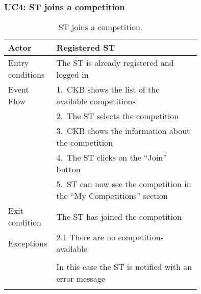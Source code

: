 \subsubsection*{UC4: ST joins a competition}
\begin{center}
  \begin{longtable}{l|p{0.75\linewidth}}
    \hline
    Actor & Registered ST \\
    \hline
    Entry conditions & The ST is already registered and logged in  \\
    \hline
    Event Flow & 1.\ CKB shows the list of the available competitions \\
    & 2.\ The ST selects the competition \\
    & 3.\ CKB shows the information about the competition \\
    & 4.\ The ST clicks on the “Join” button \\
    & 5.\ ST can now see the competition in the “My Competitions” section \\
    \hline
    Exit condition & The ST has joined the competition \\
    \hline
    Exceptions & 2.1 There are no competitions available \\ \\
    & In this case the ST is notified with an error message \\
    \hline
    \caption{ST joins a competition.}
    \label{tab: ST_join_competition}
  \end{longtable}
\end{center}

